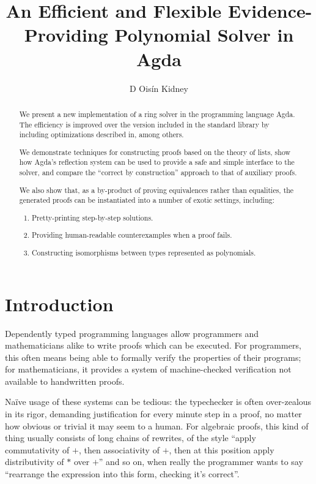 \documentclass[draft, twocolumn]{article}
\author{D Oisín Kidney}
\title{An Efficient and Flexible Evidence-Providing Polynomial Solver in Agda}
\begin{document}
\maketitle
\begin{abstract}
  We present a new implementation of a ring solver in the programming language
  Agda\cite{norell_dependently_2008}. The efficiency is improved over the
  version included in the standard library\cite{danielsson_agda_2018} by
  including optimizations described in\cite{hutchison_proving_2005}, among
  others.

  We demonstrate techniques for constructing proofs based on the theory of
  lists, show how Agda's reflection system can be used to provide a safe and
  simple interface to the solver, and compare the ``correct by construction''
  approach to that of auxiliary proofs.
  
  We also show that, as a by-product of proving equivalences rather than
  equalities, the generated proofs can be instantiated into a number of exotic
  settings, including:
  \begin{enumerate}
    \item Pretty-printing step-by-step solutions.
    \item Providing human-readable counterexamples when a proof fails.
    \item Constructing isomorphisms between types represented as polynomials.
  \end{enumerate}
\end{abstract}
\tableofcontents
\section{Introduction}
Dependently typed programming languages allow programmers and mathematicians
alike to write proofs which can be executed. For programmers, this often means
being able to formally verify the properties of their programs; for
mathematicians, it provides a system of machine-checked verification not
available to handwritten proofs.

Naïve usage of these systems can be tedious: the typechecker is often
over-zealous in its rigor, demanding justification for every minute step in a
proof, no matter how obvious or trivial it may seem to a human. For algebraic
proofs, this kind of thing usually consists of long chains of rewrites, of the
style ``apply commutativity of \(+\), then associativity of \(+\), then at this
position apply distributivity of \(*\) over \(+\)'' and so on, when really the
programmer wants to say ``rearrange the expression into this form, checking it's
correct''.
\end{document}
